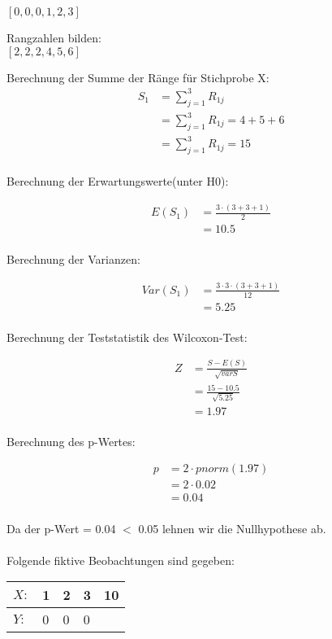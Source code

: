 \documentclass[a4paper,12pt]{article}
\begin{document}
$[0,0,0,1,2,3]$

Rangzahlen bilden: \\

$[2,2,2,4,5,6]$


Berechnung der Summe der Ränge für Stichprobe X:
\begin{align*}
S_1 
&= \sum_{j=1}^{3} R_{1j} \\
&= \sum_{j=1}^{3} R_{1j} = 4+5+6 \\
&= \sum_{j=1}^{3} R_{1j} = 15	\\
\end{align*}

Berechnung der Erwartungswerte(unter H0):

\begin{align*}
E(S_1)
&= \frac{3\cdot(3+3+1)}{2} \\
&= 10.5 \\
\end{align*}


Berechnung der Varianzen:

\begin{align*}
Var(S_1)
&= \frac{3\cdot 3 \cdot (3+3+1)}{12} \\
&=  5.25 \\
\end{align*}


Berechnung der Teststatistik des Wilcoxon-Test:

\begin{align*}
Z
&= \frac{S-E(S)}{\sqrt{varS}} \\
&= \frac{15-10.5}{\sqrt{5.25}}  \\
&= 1.97 \\
\end{align*}

Berechnung des p-Wertes:

\begin{align*}
p
&= 2 \cdot pnorm(1.97) \\
&= 2 \cdot  0.02 \\
&= 0.04 \\
\end{align*}

Da der p-Wert = 0.04 $<$ 0.05 lehnen wir die Nullhypothese ab.\\\\


Folgende fiktive Beobachtungen sind gegeben:\\

\begin{tabular}{ | l | l | l | l | p{0.5cm} |}
	\hline
	$X:$ & 1 & 2 & 3 & 10 \\ \hline
	$Y:$ & 0 & 0 & 0  \\ \hline
\end{tabular}
\end{document}
